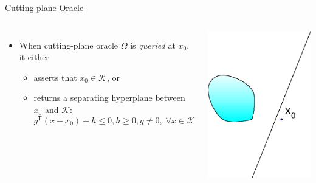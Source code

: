 \documentclass[10pt,ignorenonframetext,serif,onlymath]{beamer}
\providecommand{\tightlist}{%
  \setlength{\itemsep}{0pt}\setlength{\parskip}{0pt}}
\begin{document}
\begin{frame}{Cutting-plane Oracle}
\protect\hypertarget{sec:cutting-plane-oracle}{}

\begin{columns}


\begin{itemize}
\tightlist
\item
  When cutting-plane oracle \(\Omega\) is \emph{queried} at \(x_0\), it
  either

  \begin{itemize}
  \tightlist
  \item
    asserts that \(x_0 \in \mathcal{K}\), or
  \item
    returns a separating hyperplane between \(x_0\) and \(\mathcal{K}\):
    \[g^\mathsf{T} (x - x_0) + h \leq 0, h \geq 0, g \neq 0, \;
          \forall x \in \mathcal{K}\]
  \end{itemize}
\end{itemize}


\includegraphics{ellipsoid.files/cut.pdf}

\end{columns}

\end{frame}
\end{document}
